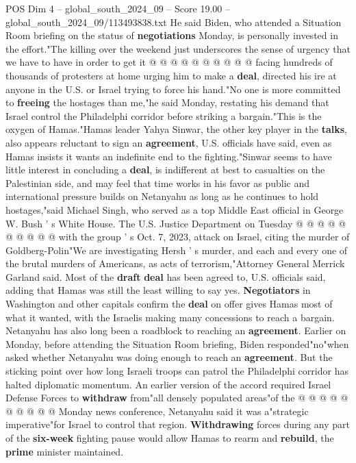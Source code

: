 \begin{textsample}{POS Dim 4 – global\_south\_2024\_09 – Score 19.00 – global\_south\_2024\_09/113493838.txt}
He said Biden, who attended a Situation Room briefing on the status of \textbf{negotiations} Monday, is personally invested in the effort."The killing over the weekend just underscores the sense of urgency that we have to have in order to get it @ @ @ @ @ @ @ @ @ @ facing hundreds of thousands of protesters at home urging him to make a \textbf{deal}, directed his ire at anyone in the U.S. or Israel trying to force his hand."No one is more committed to \textbf{freeing} the hostages than me,"he said Monday, restating his demand that Israel control the Philadelphi corridor before striking a bargain."This is the oxygen of Hamas."Hamas leader Yahya Sinwar, the other key player in the \textbf{talks}, also appears reluctant to sign an \textbf{agreement}, U.S. officials have said, even as Hamas insists it wants an indefinite end to the fighting."Sinwar seems to have little interest in concluding a \textbf{deal}, is indifferent at best to casualties on the Palestinian side, and may feel that time works in his favor as public and international pressure builds on Netanyahu as long as he continues to hold hostages,"said Michael Singh, who served as a top Middle East official in George W.
Bush ' s White House.
The U.S.
Justice Department on Tuesday @ @ @ @ @ @ @ @ @ @ with the group ' s Oct. 7, 2023, attack on Israel, citing the murder of Goldberg-Polin"We are investigating Hersh ' s murder, and each and every one of the brutal murders of Americans, as acts of terrorism,"Attorney General Merrick Garland said.
Most of the \textbf{draft} \textbf{deal} has been agreed to, U.S. officials said, adding that Hamas was still the least willing to say yes. \textbf{Negotiators} in Washington and other capitals confirm the \textbf{deal} on offer gives Hamas most of what it wanted, with the Israelis making many concessions to reach a bargain.
Netanyahu has also long been a roadblock to reaching an \textbf{agreement}.
Earlier on Monday, before attending the Situation Room briefing, Biden responded"no"when asked whether Netanyahu was doing enough to reach an \textbf{agreement}.
But the sticking point over how long Israeli troops can patrol the Philadelphi corridor has halted diplomatic momentum.
An earlier version of the accord required Israel Defense Forces to \textbf{withdraw} from"all densely populated areas"of the @ @ @ @ @ @ @ @ @ @ Monday news conference, Netanyahu said it was a"strategic imperative"for Israel to control that region. \textbf{Withdrawing} forces during any part of the \textbf{six-week} fighting pause would allow Hamas to rearm and \textbf{rebuild}, the \textbf{prime} minister maintained.

\end{textsample}
